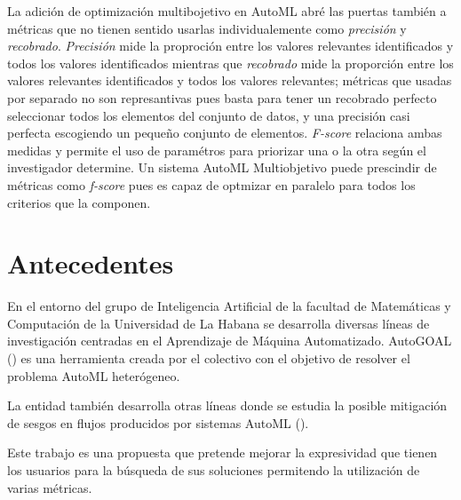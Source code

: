 La adici\'on de optimizaci\'on multibojetivo en AutoML abr\'e las puertas tambi\'en a m\'etricas que no tienen sentido usarlas individualemente como \textit{precisi\'on} y \textit{recobrado}. 
 \textit{Precisi\'on} mide la proproci\'on entre los valores relevantes identificados y todos los valores identificados
 mientras que \textit{recobrado} mide la proporci\'on entre los valores relevantes identificados y todos los valores relevantes;
m\'etricas que usadas por separado no son represantivas pues basta para tener un recobrado perfecto seleccionar todos los elementos del conjunto de datos, y una precisi\'on casi perfecta escogiendo un pequeño conjunto de elementos.
\textit{F-score} relaciona ambas medidas y permite el uso de  param\'etros para priorizar una o la otra seg\'un el investigador determine. 
Un sistema AutoML Multiobjetivo puede prescindir de m\'etricas como \textit{f-score} pues es capaz de optmizar en paralelo para todos los criterios que la componen.


\section*{Antecedentes}

En el entorno del grupo de Inteligencia Artificial de la facultad de Matem\'aticas y Computaci\'on de la Universidad de La Habana se desarrolla diversas l\'ineas de investigaci\'on centradas en el Aprendizaje de M\'aquina Automatizado. AutoGOAL (\cite{estevez2020solving}) es una herramienta creada por el colectivo con el objetivo de resolver el problema AutoML heter\'ogeneo.

La entidad tambi\'en desarrolla otras l\'ineas donde se estudia la posible mitigaci\'on de sesgos en flujos producidos por sistemas AutoML (\cite{consuegra2022intelligent}).

Este trabajo es una propuesta que pretende mejorar la expresividad que tienen los usuarios para la b\'usqueda de sus soluciones permitendo la utilizaci\'on de varias m\'etricas.

